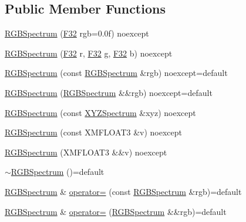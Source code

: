 \subsection*{Public Member Functions}
\begin{DoxyCompactItemize}
\item 
\hyperlink{structmage_1_1_r_g_b_spectrum_a6c740c9f3a7bdee416b374f9be3c589e}{R\+G\+B\+Spectrum} (\hyperlink{namespacemage_aa97e833b45f06d60a0a9c4fc22ae02c0}{F32} rgb=0.\+0f) noexcept
\item 
\hyperlink{structmage_1_1_r_g_b_spectrum_a788773db50b240edae6a23b1c736942d}{R\+G\+B\+Spectrum} (\hyperlink{namespacemage_aa97e833b45f06d60a0a9c4fc22ae02c0}{F32} r, \hyperlink{namespacemage_aa97e833b45f06d60a0a9c4fc22ae02c0}{F32} g, \hyperlink{namespacemage_aa97e833b45f06d60a0a9c4fc22ae02c0}{F32} b) noexcept
\item 
\hyperlink{structmage_1_1_r_g_b_spectrum_a6afbac378b74b1129a964a73ba0b516b}{R\+G\+B\+Spectrum} (const \hyperlink{structmage_1_1_r_g_b_spectrum}{R\+G\+B\+Spectrum} \&rgb) noexcept=default
\item 
\hyperlink{structmage_1_1_r_g_b_spectrum_a9035556eb53f16ce23ba458cb3e0928f}{R\+G\+B\+Spectrum} (\hyperlink{structmage_1_1_r_g_b_spectrum}{R\+G\+B\+Spectrum} \&\&rgb) noexcept=default
\item 
\hyperlink{structmage_1_1_r_g_b_spectrum_a56dd0c233d2523b1198cd2419f73a9dd}{R\+G\+B\+Spectrum} (const \hyperlink{structmage_1_1_x_y_z_spectrum}{X\+Y\+Z\+Spectrum} \&xyz) noexcept
\item 
\hyperlink{structmage_1_1_r_g_b_spectrum_a9475eed54838d0f8c7aba49bd8df0e6c}{R\+G\+B\+Spectrum} (const X\+M\+F\+L\+O\+A\+T3 \&v) noexcept
\item 
\hyperlink{structmage_1_1_r_g_b_spectrum_a8a30b69cbeefd7f59e51886ce17d48cc}{R\+G\+B\+Spectrum} (X\+M\+F\+L\+O\+A\+T3 \&\&v) noexcept
\item 
\hyperlink{structmage_1_1_r_g_b_spectrum_a7c18a007349953b1e4711a4856680b02}{$\sim$\+R\+G\+B\+Spectrum} ()=default
\item 
\hyperlink{structmage_1_1_r_g_b_spectrum}{R\+G\+B\+Spectrum} \& \hyperlink{structmage_1_1_r_g_b_spectrum_ac4701cc62489d27130853c3ba667a767}{operator=} (const \hyperlink{structmage_1_1_r_g_b_spectrum}{R\+G\+B\+Spectrum} \&rgb)=default
\item 
\hyperlink{structmage_1_1_r_g_b_spectrum}{R\+G\+B\+Spectrum} \& \hyperlink{structmage_1_1_r_g_b_spectrum_a3a487cd0fcb35395c0979552dc551829}{operator=} (\hyperlink{structmage_1_1_r_g_b_spectrum}{R\+G\+B\+Spectrum} \&\&rgb)=default
\end{DoxyCompactItemize}


